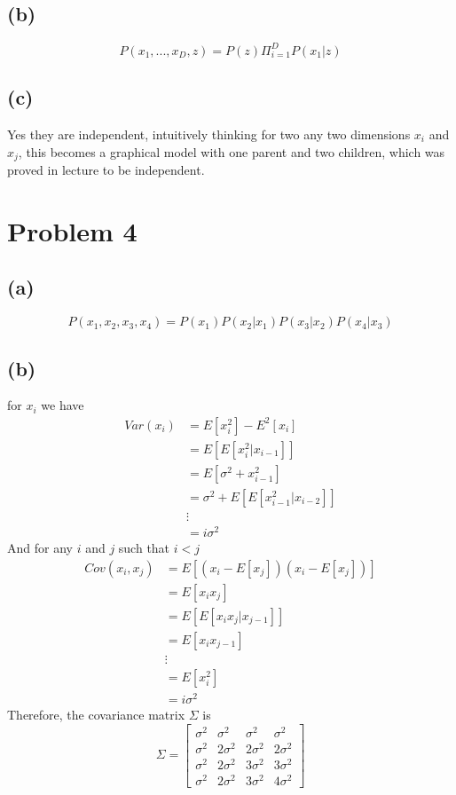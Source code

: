 \documentclass[12pt]{article}
\begin{document}
\subsection*{(b)}
$$P(x_1,...,x_D,z)=\boxed{P(z)\Pi_{i=1}^{D}P(x_1|z)}$$
\subsection*{(c)}
Yes they are independent, intuitively thinking for two any two dimensions $x_i$ and $x_j$, this becomes a graphical model with one parent and two children, which was proved in lecture to 
be independent.

 \section*{Problem 4}
 \subsection*{(a)}

$$P(x_1,x_2,x_3,x_4)=\boxed{P(x_1)P(x_2|x_1)P(x_3|x_2)P(x_4|x_3)}$$
\subsection*{(b)}
for $x_i$ we have
\begin{align*}
    Var(x_i)&=E[x_i^2]-E^2[x_i]\\
    &=E[E[x_i^2|x_{i-1}]]\\
    &=E[\sigma^2+x_{i-1}^2]\\
    &=\sigma^2+E[E[x_{i-1}^2|x_{i-2}]]\\
    &\vdots\\
    &=i\sigma^2
\end{align*}
And for any $i$ and $j$ such that $i<j$
\begin{align*}
    Cov(x_i,x_j)&=E[(x_i-E[x_j])(x_i-E[x_j])]\\
    &=E[x_ix_j]\\
    &=E[E[x_ix_j|x_{j-1}]]\\
    &=E[x_ix_{j-1}]\\
    &\vdots\\
    &=E[x_i^2]\\
    &=i\sigma^2
\end{align*}
Therefore, the covariance matrix $\Sigma$ is
$$\Sigma=\boxed{\begin{bmatrix}
    \sigma^2 & \sigma^2 & \sigma^2 & \sigma^2\\
    \sigma^2 & 2\sigma^2 & 2\sigma^2 & 2\sigma^2\\
    \sigma^2 & 2\sigma^2 & 3\sigma^2 & 3\sigma^2\\
    \sigma^2 & 2\sigma^2 & 3\sigma^2 & 4\sigma^2
    \end{bmatrix}}$$
\end{document}
